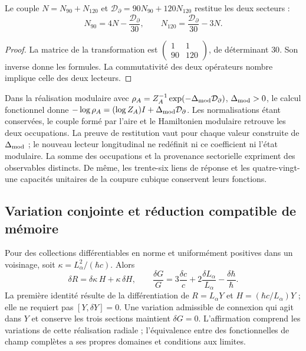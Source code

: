\begin{proposition}
Le couple
$N=N_{90}+N_{120}$ et $\mathcal D_{\partial}=90N_{90}+120N_{120}$
restitue les deux secteurs :
\[
 N_{90}=4N-\frac{\mathcal D_{\partial}}{30},\qquad
 N_{120}=\frac{\mathcal D_{\partial}}{30}-3N.
\]
\end{proposition}
\begin{proof}
La matrice de la transformation est
$\left(\begin{smallmatrix}1&1\\90&120\end{smallmatrix}\right)$,
de déterminant $30$. Son inverse donne les formules. La commutativité
des deux opérateurs nombre implique celle des deux lecteurs.
\end{proof}
Dans la réalisation modulaire avec
$\rho_A=Z_A^{-1}\exp(-\Delta_{\rm mod}\mathcal D_{\partial})$,
$\Delta_{\rm mod}>0$, le calcul fonctionnel donne
$-\log\rho_A=(\log Z_A)I+\Delta_{\rm mod}\mathcal D_{\partial}$.
Les normalisations étant conservées, le couple formé par l’aire et le
Hamiltonien modulaire retrouve les deux occupations. La preuve de restitution
vaut pour chaque valeur construite de $\Delta_{\rm mod}$ ; le nouveau lecteur
longitudinal ne redéfinit ni ce coefficient ni l’état modulaire.
La somme des occupations et la provenance sectorielle expriment des observables
distincts. De même, les trente-six liens de réponse et les
quatre-vingt-une capacités unitaires de la coupure cubique conservent leurs fonctions.

\subsection{Variation conjointe et réduction compatible de mémoire}
\label{md:rigidez:variaciones}

Pour des collections différentiables en norme et uniformément positives dans un
voisinage, soit $\kappa=L_\alpha^2/(\hbar c)$. Alors
\[
 \delta R=\delta\kappa\,H+\kappa\,\delta H,\qquad
 \frac{\delta G}{G}=3\frac{\delta c}{c}
 +2\frac{\delta L_\alpha}{L_\alpha}-\frac{\delta\hbar}{\hbar}.
\]
La première identité résulte de la différentiation de
$R=L_\alpha Y$ et $H=(\hbar c/L_\alpha)Y$ ; elle ne requiert pas
$[Y,\delta Y]=0$. Une variation admissible de connexion qui agit dans $Y$
et conserve les trois sections maintient $\delta G=0$.
L’affirmation comprend les variations de cette réalisation radiale ;
l’équivalence entre des fonctionnelles de champ complètes a ses propres
domaines et conditions aux limites.

